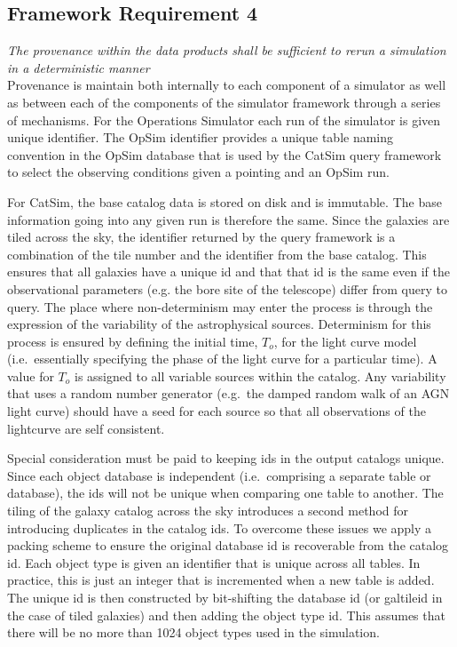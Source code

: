 \documentclass[11pt]{article}
\begin{document}
\subsection{Framework Requirement 4} 
\label{sec:determine}
{\it The provenance within the data products shall be sufficient to rerun a simulation in a 
deterministic manner}\\

Provenance is maintain both internally to each component of a
simulator as well as between each of the components
of the simulator framework through a series of mechanisms. For the
Operations Simulator each run of the simulator is given unique
identifier.  The OpSim identifier provides a unique table naming
convention in the OpSim database that is used by the CatSim query
framework to select the observing conditions given a pointing and an
OpSim run. 

For CatSim, the base catalog data is stored on disk and is
immutable. The base information going into any given run is therefore
the same.  Since the galaxies are tiled across the sky, the identifier
returned by the query framework is a combination of the tile number
and the identifier from the base catalog. This ensures that all
galaxies have a unique id and that that id is the same even if the
observational parameters (e.g. the bore site of the telescope) differ
from query to query.  The place where non-determinism may enter the
process is through the expression of the variability of the
astrophysical sources. Determinism for this process is ensured by
defining the initial time, $T_o$, for the light curve model (i.e.\
essentially specifying the phase of the light curve for a particular
time). A value for $T_o$ is assigned to all variable sources within
the catalog.  Any variability that uses a random number
generator (e.g.\ the damped random walk of an AGN light curve) should have a
seed for each source so that all observations of the lightcurve are self consistent.

Special consideration must be paid to keeping ids in the output
catalogs unique.  Since each object database is independent (i.e.\
comprising a separate table or database), the ids will not be unique
when comparing one table to another. The tiling of the galaxy catalog
across the sky introduces a second method for introducing duplicates
in the catalog ids. To overcome these issues we apply a packing scheme
to ensure the original database id is recoverable from the catalog id.
Each object type is given an identifier that is unique across all
tables.  In practice, this is just an integer that is incremented when
a new table is added.  The unique id is then constructed by
bit-shifting the database id (or galtileid in the case of tiled
galaxies) and then adding the object type id.  This assumes that there will
be no more than 1024 object types used in the simulation.
\end{document}
